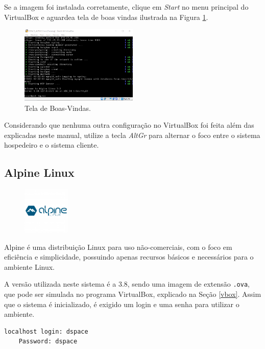 Se a imagem foi instalada corretamente, clique em \textit{Start} no menu principal do VirtualBox e aguardea tela de boas vindas ilustrada na Figura \ref{fig1}.
\begin{figure}[H]
    \centering
    \includegraphics[width=0.5\textwidth]{images/vbox2.png}
    \caption{Tela de Boas-Vindas.}
    \label{fig1}
\end{figure}

Considerando que nenhuma outra configuração no VirtualBox foi feita além das explicadas neste manual, utilize a tecla \textit{AltGr} para alternar o foco entre o sistema hospedeiro e o sistema cliente. 

\subsection{Alpine Linux}\label{alpine}

 \begin{figure} %
     \centering
     \includegraphics[width=0.2\textwidth]{../images/alpine.png}
     \label{fig2}
 \end{figure}

Alpine é uma distribuição Linux para uso não-comerciais, com o foco em eficiência e simplicidade, possuindo apenas recursos básicos e necessários para o ambiente Linux.

A versão utilizada neste sistema é a 3.8, sendo uma imagem de extensão \lstinline{.ova}, que pode ser simulada no programa VirtualBox, explicado na Seção \ref{vbox}. Assim que o sistema é inicializado, é exigido um login e uma senha para utilizar o ambiente. 

\begin{lstlisting}[language=bash, label=lst1, caption=Login e senha de acesso]
    localhost login: dspace
    Password: dspace
\end{lstlisting}

